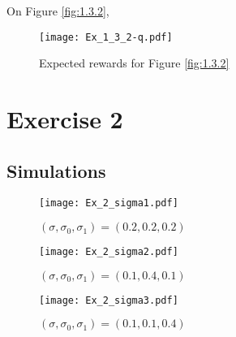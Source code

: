 \documentclass[a4paper,11pt]{article}
\begin{document}
On Figure \ref{fig:1.3.2},

\begin{figure}[H]
  \center
  \texttt{[image: Ex\_1\_3\_2-q.pdf]}
  \caption{\label{fig:1.3.2q} Expected rewards for Figure \ref{fig:1.3.2}}
\end{figure}

\section{Exercise 2}
\subsection{Simulations}
\begin{figure}[H]
  \center
  \texttt{[image: Ex\_2\_sigma1.pdf]}
  \caption{\label{fig:2.1} $(\sigma, \sigma_{0}, \sigma_{1}) = (0.2, 0.2, 0.2)$}
\end{figure}

\begin{figure}[H]
  \center
  \texttt{[image: Ex\_2\_sigma2.pdf]}
  \caption{\label{fig:2.2} $(\sigma, \sigma_{0}, \sigma_{1}) = (0.1, 0.4, 0.1)$}
\end{figure}

\begin{figure}[H]
  \center
  \texttt{[image: Ex\_2\_sigma3.pdf]}
  \caption{\label{fig:2.3} $(\sigma, \sigma_{0}, \sigma_{1}) = (0.1, 0.1, 0.4)$}
\end{figure}

\subsection{}


\end{document}
